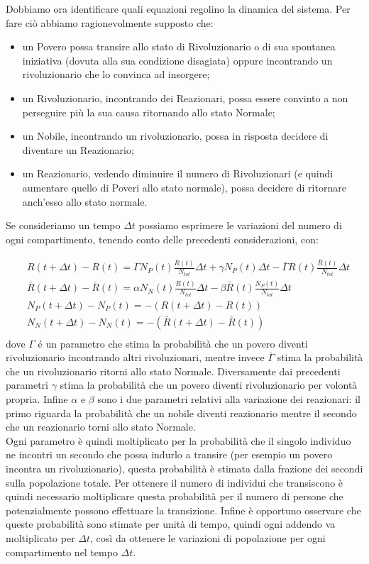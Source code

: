 Dobbiamo ora identificare quali equazioni regolino la dinamica del sistema. Per fare ciò abbiamo ragionevolmente supposto che:
\begin{itemize}
	\item un Povero possa transire allo stato di Rivoluzionario o di sua spontanea iniziativa (dovuta alla sua condizione disagiata) oppure incontrando un rivoluzionario che lo convinca ad insorgere;
	\item un Rivoluzionario, incontrando dei Reazionari, possa essere convinto a non perseguire più la sua causa ritornando allo stato Normale;
	\item un Nobile, incontrando un rivoluzionario, possa in risposta decidere di diventare un Reazionario;
	\item un Reazionario, vedendo diminuire il numero di Rivoluzionari (e quindi aumentare quello di Poveri allo stato normale), possa decidere di ritornare anch'esso allo stato normale.
\end{itemize}
Se consideriamo un tempo $\Delta t$ possiamo esprimere le variazioni del numero di ogni compartimento, tenendo conto delle precedenti considerazioni, con:

\begin{equation}\label{modelloDiscreto}
	\begin{aligned}
		 &R(t+\Delta t)-R(t)=\Gamma N_P(t) \frac{R(t)}{N_{tot}}\Delta t+\gamma N_P(t)\Delta t-\bar{\Gamma}R(t)\frac{\bar{R}(t)}{N_{tot}}\Delta t\\
		&\bar{R}(t+\Delta t)-\bar{R}(t)=\alpha N_N(t)\frac{R(t)}{N_{tot}}\Delta t-\beta \bar{R}(t)\frac{N_P(t)}{N_{tot}}\Delta t\\
		&N_P(t+\Delta t)-N_P(t)=-(R(t+\Delta t)-R(t))\\
		&N_N(t+\Delta t)-N_N(t)=-(\bar{R}(t+\Delta t)-\bar{R}(t))\\
	\end{aligned}     
\end{equation}	
dove $ \Gamma $ é un parametro che stima la probabilità che un povero diventi rivoluzionario incontrando altri rivoluzionari, mentre invece $ \bar{\Gamma} $ stima la probabilità che un rivoluzionario ritorni allo stato Normale.  Diversamente dai precedenti parametri $\gamma$ stima la probabilità che un povero diventi rivoluzionario per volontà propria. Infine $ \alpha $ e $ \beta $ sono i due parametri relativi alla variazione dei reazionari: il primo riguarda la probabilità che un nobile diventi reazionario mentre il secondo che un reazionario torni allo stato Normale. \\
Ogni parametro è quindi moltiplicato per la probabilità che il singolo individuo ne incontri un secondo che possa indurlo a transire (per esempio un povero incontra un rivoluzionario), questa probabilità è stimata dalla frazione dei secondi sulla popolazione totale. Per ottenere il numero di individui che transiscono è quindi necessario moltiplicare questa probabilità per il numero di persone che potenzialmente possono effettuare la transizione. Infine è opportuno osservare che queste probabilità sono stimate per unità di tempo, quindi ogni addendo va moltiplicato per $\Delta t$, così da ottenere le variazioni di popolazione per ogni compartimento nel tempo $\Delta t$.\\


